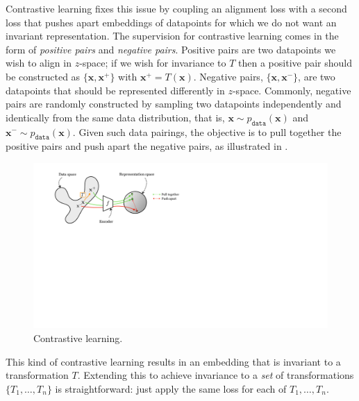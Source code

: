 Contrastive learning fixes this issue by coupling an alignment loss with a second loss that pushes apart embeddings of datapoints for which we do not want an invariant representation. The supervision for contrastive learning comes in the form of \textit{positive pairs} and \textit{negative pairs}. Positive pairs are two datapoints we wish to align in $z$-space; if we wish for invariance to $T$ then a positive pair should be constructed as $\{\mathbf{x}, \mathbf{x}^{+}\}$ with $\mathbf{x}^{+} = T(\mathbf{x})$. Negative pairs, $\{\mathbf{x},\mathbf{x}^-\}$, are two datapoints that should be represented differently in $z$-space. Commonly, negative pairs are randomly constructed by sampling two datapoints independently and identically from the same data distribution, that is, $\mathbf{x} \sim p_{\texttt{data}}(\mathbf{x})$ and $\mathbf{x}^{-} \sim p_{\texttt{data}}(\mathbf{x})$. Given such data pairings, the objective is to pull together the positive pairs and push apart the negative pairs, as illustrated in \fig{\ref{fig:representation_learning:contrastive_learning_diagram}}.
\begin{figure}[h!]
    \centerline{
        \includegraphics[width=0.75\linewidth]{figures/representation_learning/contrastive_learning_diagram.pdf}
    }
   \caption{Contrastive learning.}
  \label{fig:representation_learning:contrastive_learning_diagram}
\end{figure}

This kind of contrastive learning results in an embedding that is invariant to a transformation $T$. Extending this to achieve invariance to a \textit{set} of transformations $\{T_1, \ldots, T_n\}$ is straightforward: just apply the same loss for each of $T_1, \ldots, T_n$. 

